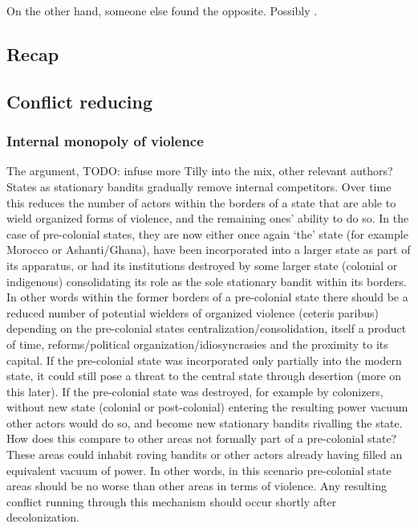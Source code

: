 \documentclass[12pt]{article}
\begin{document}
On the other hand, someone else found the opposite. Possibly \citet{Besley2014}.

\subsection{Recap \citet{Paine2019}}

\subsection{Conflict reducing}

\subsubsection{Internal monopoly of violence}

The \citet{Tilly1990} argument, TODO: infuse more Tilly into the mix, other
relevant authors? States as stationary bandits gradually remove internal
competitors. Over time this reduces the number of actors within the borders of a
state that are able to wield organized forms of violence, and the remaining
ones' ability to do so. In the case of pre-colonial states, they are now either
once again `the' state (for example Morocco or Ashanti/Ghana), have been
incorporated into a larger state as part of its apparatus, or had its
institutions destroyed by some larger state (colonial or indigenous)
consolidating its role as the sole stationary bandit within its borders. In
other words within the former borders of a pre-colonial state there should be a
reduced number of potential wielders of organized violence (ceteris paribus)
depending on the pre-colonial states centralization/consolidation, itself a
product of time, reforms/political organization/idiosyncrasies and the proximity
to its capital. If the pre-colonial state was incorporated only partially into
the modern state, it could still pose a threat to the central state through
desertion (more on this later). If the pre-colonial state was destroyed, for
example by colonizers, without new state (colonial or post-colonial) entering
the resulting power vacuum other actors would do so, and become new stationary
bandits rivalling the state. How does this compare to other areas not formally
part of a pre-colonial state? These areas could inhabit roving bandits
\citep{Scott2009} or other actors already having filled an equivalent vacuum of
power. In other words, in this scenario pre-colonial state areas should be no
worse than other areas in terms of violence. Any resulting conflict running
through this mechanism should occur shortly after decolonization.
\end{document}
